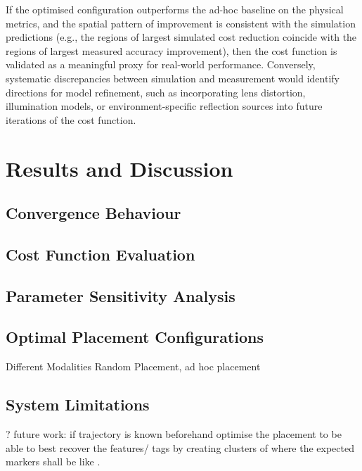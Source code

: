 If the optimised configuration outperforms the ad-hoc baseline on the physical metrics, and the spatial pattern of improvement is consistent with the simulation predictions (e.g., the regions of largest simulated cost reduction coincide with the regions of largest measured accuracy improvement), then the cost function is validated as a meaningful proxy for real-world performance. Conversely, systematic discrepancies between simulation and measurement would identify directions for model refinement, such as incorporating lens distortion, illumination models, or environment-specific reflection sources into future iterations of the cost function.


\section{Results and Discussion}
\subsection{Convergence Behaviour}
\subsection{Cost Function Evaluation}
\subsection{Parameter Sensitivity Analysis}
\subsection{Optimal Placement Configurations}
Different Modalities
Random Placement, ad hoc placement 
\subsection{System Limitations} ?
future work: if trajectory is known beforehand optimise the placement to be able to best recover the features/ tags by creating clusters of where the expected markers shall be like \parencite{aissaouiOptimisationTechniqueCamera2014}. 